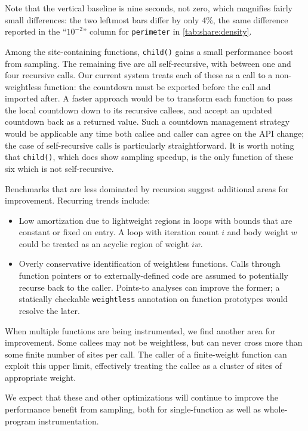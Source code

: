 Note that the vertical baseline is nine seconds, not zero, which
magnifies fairly small differences: the two leftmost bars differ by
only 4\%, the same difference reported in the ``$10^{-2}$'' column for
\texttt{perimeter} in \autoref{tab:share:density}.

Among the site-containing functions, \texttt{child()} gains a small
performance boost from sampling.  The remaining five are all
self-recursive, with between one and four recursive calls.  Our
current system treats each of these as a call to a non-weightless
function: the countdown must be exported before the call and imported
after.  A faster approach would be to transform each function to pass
the local countdown down to its recursive callees, and accept an
updated countdown back as a returned value.  Such a countdown
management strategy would be applicable any time both callee and
caller can agree on the API change; the case of self-recursive calls
is particularly straightforward.  It is worth noting that
\texttt{child()}, which does show sampling speedup, is the only
function of these six which is not self-recursive.

Benchmarks that are less dominated by recursion suggest additional
areas for improvement.  Recurring trends include:

\begin{itemize}
\item Low amortization due to lightweight regions in loops with bounds
  that are constant or fixed on entry.  A loop with iteration count
  $i$ and body weight $w$ could be treated as an acyclic region of
  weight $iw$.
  
\item Overly conservative identification of weightless functions.
  Calls through function pointers or to externally-defined code are
  assumed to potentially recurse back to the caller.  Points-to
  analyses can improve the former; a statically checkable
  \texttt{weightless} annotation on function prototypes would resolve
  the later.
\end{itemize}

When multiple functions are being instrumented, we find another area
for improvement.  Some callees may not be weightless, but can never
cross more than some finite number of sites per call.  The caller of a
finite-weight function can exploit this upper limit, effectively
treating the callee as a cluster of sites of appropriate weight.

We expect that these and other optimizations will continue to improve
the performance benefit from sampling, both for single-function as
well as whole-program instrumentation.

